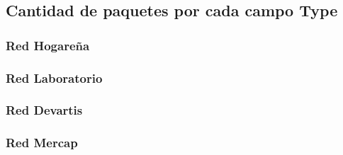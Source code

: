 \subsection{Cantidad de paquetes por cada campo Type}

\subsubsection{Red Hogareña}
\subsubsection{Red Laboratorio}
\subsubsection{Red Devartis}
\subsubsection{Red Mercap}